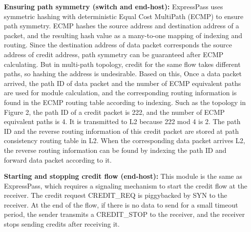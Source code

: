 \documentclass[conference,compsoc]{IEEEtran}
\begin{document}
\textbf{Ensuring path symmetry (switch and end-host): }ExpressPass uses symmetric hashing with deterministic Equal Cost MultiPath (ECMP) to ensure path symmetry. ECMP hashes the source address and destination address of a packet, and the resulting hash value as a many-to-one mapping of indexing and routing. Since the destination address of data packet corresponds the source address of credit address, path symmetry can be guaranteed after ECMP calculating. But in multi-path topology, credit for the same flow takes different paths, so hashing the address is undesirable. Based on this, Once a data packet arrived, the path ID of data packet and the number of ECMP equivalent paths are used for module calculation, and the corresponding routing information is found in the ECMP routing table according to indexing. Such as the topology in Figure 2, the path ID of a credit packet is 222, and the number of ECMP equivalent paths is 4. It is transmitted to L2 because 222 mod 4 is 2. The path ID and the reverse routing information of this credit packet  are stored at path consistency routing table in L2. When the corresponding data packet arrives L2, the reverse routing information can be found by indexing the path ID and forward data packet according to it.

\textbf{Starting and stopping credit flow (end-host):} This module is the same as ExpressPass, which requires a signaling mechanism to start the credit flow at the receiver. The credit request CREDIT\_REQ is piggybacked by SYN to the receiver. At the end of the flow, if there is no data to send for a small timeout period, the sender transmits a CREDIT\_STOP to the receiver, and the receiver stops sending credits after receiving it.
\end{document}
